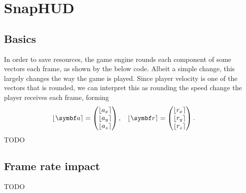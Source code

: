 \section{SnapHUD}
\label{sec:snaphud}

\subsection{Basics}
\label{sec:basics}
In order to save resources, the game engine rounds each component of some vectors each frame, as shown by the below code. Albeit a simple change, this largely changes the way the game is played.
Since player velocity is one of the vectors that is rounded, we can interpret this as rounding the speed change the player receives each frame, forming
\begin{align*}
\round{\vec{a}} &=
\begin{pmatrix}
\lfloor a_x\rceil \\ \lfloor a_y\rceil \\ \lfloor a_z\rceil %
\end{pmatrix}, & \round{\vec{r}} &=
\begin{pmatrix}
\lfloor r_x\rceil \\ \lfloor r_y\rceil \\ \lfloor r_z\rceil
\end{pmatrix}.
\end{align*}
TODO


\subsection{Frame rate impact}
\label{sec:snap_frame_rate}
TODO

